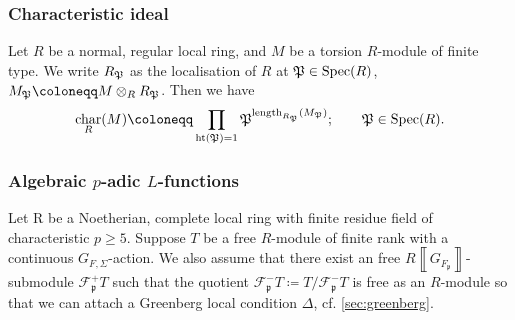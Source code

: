 \documentclass[10pt]{amsart}
\numberwithin{equation}{section}
\theoremstyle{definition}
\theoremstyle{remark} %
\newcommand{\bbox}[1]{\left\llbracket#1\right\rrbracket}
\DeclareMathOperator{\Char}{char}
\newcommand{\scrF}{\mathscr{F}}
\newcommand{\p}{\mathfrak{p}}
\begin{document}
	\subsubsection{Characteristic ideal}
	Let $ R $ be a normal, regular local ring, and $ M $ be a torsion $ R $-module of finite type. We write $ R_{\frak P} $ as the localisation of $ R $ at $ \frak P \in \operatorname{Spec}(R)$, $ M_{\frak P} \coloneqq M \otimes_R  R_{\frak P} $. Then we have
	\begin{align*}
		\Char_{R}(M) \coloneqq \prod_{\operatorname{ht}(\frak P)=1} \frak P^{\operatorname{length}_{R_{\frak P}}(M_{\frak P}) }; \qquad \frak P \in \operatorname{Spec}(R).
	\end{align*} 
	\subsubsection{Algebraic $ p $-adic $ L $-functions}
	Let R be a Noetherian, complete local ring with finite residue field of characteristic $ p\ge 5 $. Suppose $ T $ be a free $ R $-module of finite rank with a continuous $ G_{F,\Sigma} $-action. We also assume that there exist an free $ R\bbox{G_{F_\p}} $-submodule $ \scrF_{\p}^+T $ such that the quotient $ \scrF_{\p}^-T \coloneqq T/\scrF_{\p}^-T $ is free as an $ R $-module so that we can attach a Greenberg local condition $ \Delta $, cf. \textsection \ref{sec:greenberg}.
	
\end{document}
